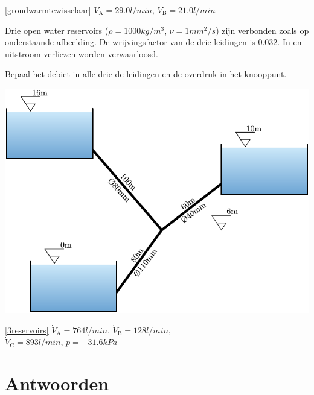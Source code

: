 \begin{antwoord}{\ref{grondwarmtewisselaar}}
	$\dot{V}_\mathrm{A} = 29.0\unit{l/min}$, $\dot{V}_\mathrm{B} = 21.0\unit{l/min}$
\end{antwoord}
\begin{toepassing}[*]
	\label{3reservoirs}
Drie open water reservoirs ($\rho=1000\unit{kg/m^3}$, $\nu=1\unit{mm^2/s}$) zijn verbonden zoals op onderstaande afbeelding. De wrijvingsfactor van de drie leidingen is $0.032$. In en uitstroom verliezen worden verwaarloosd.
		
Bepaal het debiet in alle drie de leidingen en de overdruk in het knooppunt.
		
	\centering
	\includegraphics{fig/leidingstelsels/3reservoirs}
\end{toepassing}
\begin{antwoord}{\ref{3reservoirs}}
		$\dot{V}_\mathrm{A} = 764\unit{l/min}$, $\dot{V}_\mathrm{B} = 128\unit{l/min}$,\\
		$\dot{V}_\mathrm{C} = 893\unit{l/min}$, $p=-31.6\unit{kPa}$
\end{antwoord}
\section*{Antwoorden}
	\begin{multicols}{2}
	\end{multicols}
